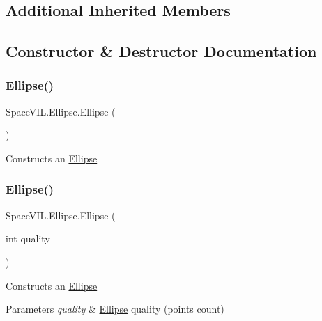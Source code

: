 \subsection*{Additional Inherited Members}


\subsection{Constructor \& Destructor Documentation}
\mbox{\label{class_space_v_i_l_1_1_ellipse_a33ed4c5c8bbdb3a3fe9001292dc7b58e}} 
\subsubsection{\texorpdfstring{Ellipse()}{Ellipse()}\hspace{0.1cm}{\footnotesize\ttfamily [1/2]}}
{\footnotesize\ttfamily Space\+V\+I\+L.\+Ellipse.\+Ellipse (\begin{DoxyParamCaption}{ }\end{DoxyParamCaption})}



Constructs an \mbox{\hyperlink{class_space_v_i_l_1_1_ellipse}{Ellipse}} 

\mbox{\label{class_space_v_i_l_1_1_ellipse_a972b5c63aba04b84274f5048351a851a}} 
\subsubsection{\texorpdfstring{Ellipse()}{Ellipse()}\hspace{0.1cm}{\footnotesize\ttfamily [2/2]}}
{\footnotesize\ttfamily Space\+V\+I\+L.\+Ellipse.\+Ellipse (\begin{DoxyParamCaption}\item[{int}]{quality }\end{DoxyParamCaption})}



Constructs an \mbox{\hyperlink{class_space_v_i_l_1_1_ellipse}{Ellipse}} 


\begin{DoxyParams}{Parameters}
{\em quality} & \mbox{\hyperlink{class_space_v_i_l_1_1_ellipse}{Ellipse}} quality (points count) \\
\hline
\end{DoxyParams}


